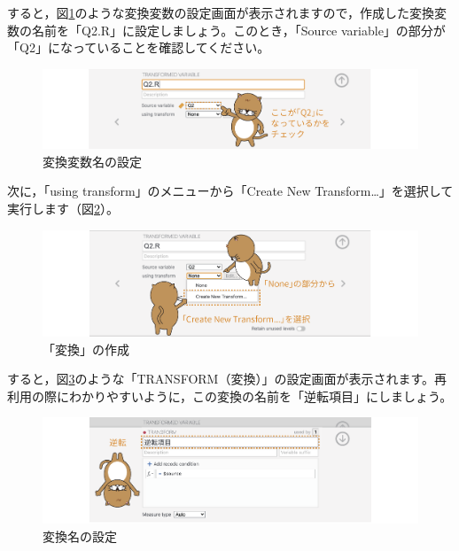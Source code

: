 \documentclass[
  12pt,
  a5jpaper,
  lualatex, ja=standard]{bxjsbook}
\begin{document}
すると，図\ref{fig:basics-exercise-set-transform}のような変換変数の設定画面が表示されますので，作成した変換変数の名前を「Q2.R」に設定しましょう。このとき，「Source variable」の部分が「Q2」になっていることを確認してください。

\begin{figure}[!ht]

{\centering \includegraphics[width=1\linewidth]{images/basics/exercise-set-transform} 

}

\caption{変換変数名の設定}\label{fig:basics-exercise-set-transform}
\end{figure}

次に，「using transform」のメニューから「Create New Transform\ldots」を選択して実行します（図\ref{fig:basics-exercise-using-transform}）。

\begin{figure}[!ht]

{\centering \includegraphics[width=1\linewidth]{images/basics/exercise-using-transform} 

}

\caption{「変換」の作成}\label{fig:basics-exercise-using-transform}
\end{figure}

すると，図\ref{fig:basics-exercise-transform-name}のような「TRANSFORM（変換）」の設定画面が表示されます。再利用の際にわかりやすいように，この変換の名前を「逆転項目」にしましょう。

\begin{figure}[!ht]

{\centering \includegraphics[width=1\linewidth]{images/basics/exercise-transform-name} 

}

\caption{変換名の設定}\label{fig:basics-exercise-transform-name}
\end{figure}
\end{document}
